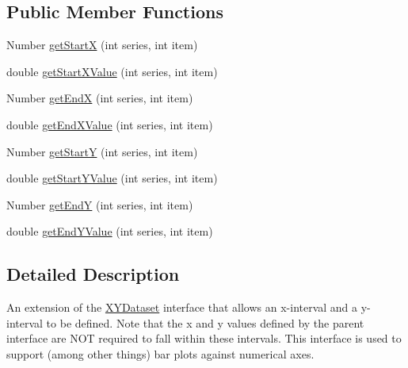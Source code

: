 \subsection*{Public Member Functions}
\begin{DoxyCompactItemize}
\item 
Number \mbox{\hyperlink{interfaceorg_1_1jfree_1_1data_1_1xy_1_1_interval_x_y_dataset_a7548ec7d60d72463313dc6f10aceee62}{get\+StartX}} (int series, int item)
\item 
double \mbox{\hyperlink{interfaceorg_1_1jfree_1_1data_1_1xy_1_1_interval_x_y_dataset_a437afe7f637a8d16ad305023a7819eef}{get\+Start\+X\+Value}} (int series, int item)
\item 
Number \mbox{\hyperlink{interfaceorg_1_1jfree_1_1data_1_1xy_1_1_interval_x_y_dataset_a93161a6d6c1db37cfac030239c62ab0a}{get\+EndX}} (int series, int item)
\item 
double \mbox{\hyperlink{interfaceorg_1_1jfree_1_1data_1_1xy_1_1_interval_x_y_dataset_ad976e66caa1fc4d72a599f2c26c55dcc}{get\+End\+X\+Value}} (int series, int item)
\item 
Number \mbox{\hyperlink{interfaceorg_1_1jfree_1_1data_1_1xy_1_1_interval_x_y_dataset_afdd414735adb233734bc35b76a005ed9}{get\+StartY}} (int series, int item)
\item 
double \mbox{\hyperlink{interfaceorg_1_1jfree_1_1data_1_1xy_1_1_interval_x_y_dataset_aed1acf6e36561ce5acc3f6811a2ecef9}{get\+Start\+Y\+Value}} (int series, int item)
\item 
Number \mbox{\hyperlink{interfaceorg_1_1jfree_1_1data_1_1xy_1_1_interval_x_y_dataset_ae938af574bad07e7f47a8b423223ef9b}{get\+EndY}} (int series, int item)
\item 
double \mbox{\hyperlink{interfaceorg_1_1jfree_1_1data_1_1xy_1_1_interval_x_y_dataset_a0538ada774aad34ec95edbb84c1a82e1}{get\+End\+Y\+Value}} (int series, int item)
\end{DoxyCompactItemize}


\subsection{Detailed Description}
An extension of the \mbox{\hyperlink{interfaceorg_1_1jfree_1_1data_1_1xy_1_1_x_y_dataset}{X\+Y\+Dataset}} interface that allows an x-\/interval and a y-\/interval to be defined. Note that the x and y values defined by the parent interface are N\+OT required to fall within these intervals. This interface is used to support (among other things) bar plots against numerical axes. 

